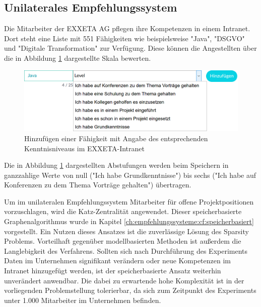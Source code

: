 \subsection{Unilaterales Empfehlungssystem}
\label{ch:methodik:versuchsaufbau:unilateral}
Die Mitarbeiter der EXXETA AG pflegen ihre Kompetenzen in einem Intranet. Dort steht eine Liste mit 551 Fähigkeiten wie beispielsweise "Java", "DSGVO" und "Digitale Transformation" zur Verfügung. Diese können die Angestellten über die in Abbildung \ref{fig:methodik:versuchsaufbau:daten:abb1} dargestellte Skala bewerten.

\begin{figure}[h]
	\centering
	\includegraphics[width=1\textwidth]{gfx/skill-level.png}
	\caption{Hinzufügen einer Fähigkeit mit Angabe des entsprechenden Kenntnisniveaus im EXXETA-Intranet}
	\label{fig:methodik:versuchsaufbau:daten:abb1}
\end{figure}

Die in Abbildung \ref{fig:methodik:versuchsaufbau:daten:abb1} dargestellten Abstufungen werden beim Speichern in ganzzahlige Werte von null ("Ich habe Grundkenntnisse") bis sechs ("Ich habe auf Konferenzen zu dem Thema Vorträge gehalten") übertragen.

Um im unilateralen Empfehlungssystem Mitarbeiter für offene Projektpositionen vorzuschlagen, wird die Katz-Zentralität angewendet. Dieser speicherbasierte Graphenalgorithmus wurde in Kapitel \ref{ch:empfehlungssysteme:cf:speicherbasiert} vorgestellt. Ein Nutzen dieses Ansatzes ist die zuverlässige Lösung des Sparsity Problems. Vorteilhaft gegenüber modellbasierten Methoden ist außerdem die Langlebigkeit des Verfahrens. Sollten sich nach Durchführung des Experiments Daten im Unternehmen signifikant verändern oder neue Kompetenzen im Intranet hinzugefügt werden, ist der speicherbasierte Ansatz weiterhin unverändert anwendbar. Die dabei zu erwartende hohe Komplexität ist in der vorliegenden Problemstellung tolerierbar, da sich zum Zeitpunkt des Experiments unter 1.000 Mitarbeiter im Unternehmen befinden.

